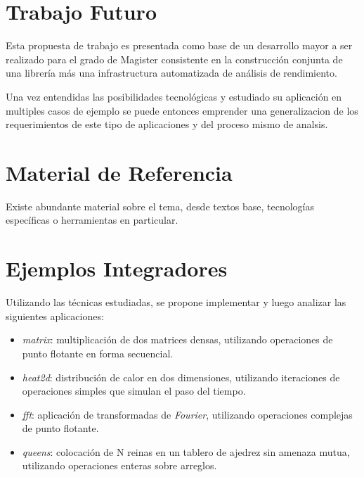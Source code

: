 \documentclass[a4paper,twocolumn]{article}
\begin{document}
\section{Trabajo Futuro}

Esta propuesta de trabajo es presentada como base de un desarrollo mayor a ser
realizado para el grado de Magister consistente en la construcci\'on conjunta de
una librer\'ia m\'as una infrastructura automatizada de an\'alisis de rendimiento.

\smallskip

Una vez entendidas las posibilidades tecnol\'ogicas y estudiado su aplicaci\'on en
multiples casos de ejemplo se puede entonces emprender una generalizacion de los
requerimientos de este tipo de aplicaciones y del proceso mismo de analsis.

\section{Material de Referencia}

Existe abundante material sobre el tema, desde textos base, tecnolog\'ias
espec\'ificas o herramientas en particular.

\appendix

\section{Ejemplos Integradores}

Utilizando las t\'ecnicas estudiadas, se propone implementar y luego analizar las
siguientes aplicaciones:

\begin{itemize}

\item \emph{matrix}: multiplicaci\'on de dos matrices densas, utilizando operaciones
  de punto flotante en forma secuencial.

\item \emph{heat2d}: distribuci\'on de calor en dos dimensiones, utilizando
  iteraciones de operaciones simples que simulan el paso del tiempo.

\item \emph{fft}: aplicaci\'on de transformadas de {\it Fourier}, utilizando
  operaciones complejas de punto flotante.

\item \emph{queens}: colocaci\'on de N reinas en un tablero de
  ajedrez sin amenaza mutua, utilizando operaciones enteras sobre arreglos.

\end{itemize}
\end{document}

